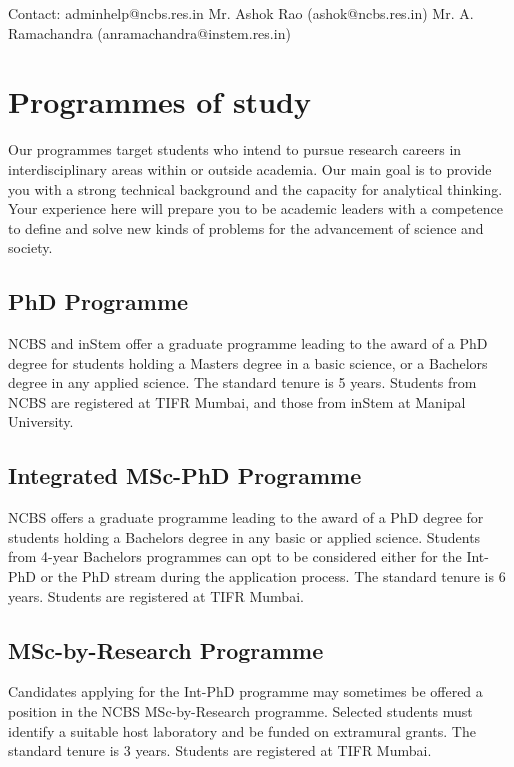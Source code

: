 \documentclass[a4paper,10pt]{article}
\begin{document}
Contact: adminhelp@ncbs.res.in
Mr. Ashok Rao (ashok@ncbs.res.in)
Mr. A. Ramachandra (anramachandra@instem.res.in)

\newpage
\tableofcontents

\newpage
\section{Programmes of study}

Our programmes target students who intend to pursue research careers in interdisciplinary
areas within or outside academia. Our main goal is to provide you with a strong technical
background and the capacity for analytical thinking. Your experience here will prepare you
to be academic leaders with a competence to define and solve new kinds of problems for the
advancement of science and society.

\subsection{PhD Programme}
NCBS and inStem offer a graduate programme leading to the award of a
PhD degree for students holding a Masters degree in a basic science, or a Bachelors degree
in any applied science. The standard tenure is 5 years. Students from NCBS are registered at
TIFR Mumbai, and those from inStem at Manipal University.

\subsection{Integrated MSc-PhD Programme}
NCBS offers a graduate programme leading to the
award of a PhD degree for students holding a Bachelors degree in any basic or applied
science. Students from 4-year Bachelors programmes can opt to be considered either for the
Int-PhD or the PhD stream during the application process. The standard tenure is 6 years.
Students are registered at TIFR Mumbai.

\subsection{MSc-by-Research Programme}
Candidates applying for the Int-PhD programme may
sometimes be offered a position in the NCBS MSc-by-Research programme. Selected
students must identify a suitable host laboratory and be funded on extramural grants. The
standard tenure is 3 years. Students are registered at TIFR Mumbai.
\end{document}
